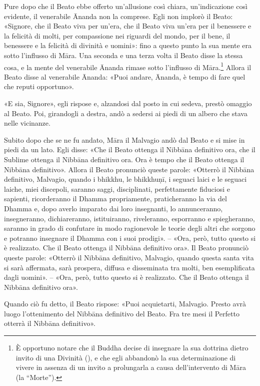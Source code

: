 Pure dopo che il Beato ebbe offerto un’allusione così chiara, un’indicazione
così evidente, il venerabile Ānanda non la comprese. Egli non implorò il Beato:
«Signore, che il Beato viva per un’era, che il Beato viva un’era per il
benessere e la felicità di molti, per compassione nei riguardi del mondo, per il
bene, il benessere e la felicità di divinità e uomini»: fino a questo punto la
sua mente era sotto l’influsso di Māra. Una seconda e una terza volta il Beato
disse la stessa cosa, e la mente del venerabile Ānanda rimase sotto l’influsso
di Māra.\footnote{È opportuno notare che il Buddha decise di insegnare la sua
  dottrina dietro invito di una Divinità
  (\hyperlink{cap-03-Dopo-l-Illuminazione#pag45}{}), e che egli abbandonò la sua
  determinazione di vivere in assenza di un invito a prolungarla a causa
  dell’intervento di Māra (la “Morte”).} Allora il Beato disse al venerabile
Ānanda: «Puoi andare, Ānanda, è tempo di fare quel che reputi opportuno».

«E sia, Signore», egli rispose e, alzandosi dal posto in cui sedeva, prestò
omaggio al Beato. Poi, girandogli a destra, andò a sedersi ai piedi di un albero
che stava nelle vicinanze.

Subito dopo che se ne fu andato, Māra il Malvagio andò dal Beato e si mise in
piedi da un lato. Egli disse: «Che il Beato ottenga il Nibbāna definitivo ora,
che il Sublime ottenga il Nibbāna definitivo ora. Ora è tempo che il Beato
ottenga il Nibbāna definitivo». Allora il Beato pronunciò queste parole:
«Otterrò il Nibbāna definitivo, Malvagio, quando i bhikkhu, le bhikkhuṇī, i
seguaci laici e le seguaci laiche, miei discepoli, saranno saggi, disciplinati,
perfettamente fiduciosi e sapienti, ricorderanno il Dhamma propriamente,
praticheranno la via del Dhamma e, dopo averlo imparato dai loro insegnanti, lo
annunceranno, insegneranno, dichiareranno, istituiranno, riveleranno, esporranno
e spiegheranno, saranno in grado di confutare in modo ragionevole le teorie
degli altri che sorgono e potranno insegnare il Dhamma con i suoi prodigi». –
«Ora, però, tutto questo si è realizzato. Che il Beato ottenga il Nibbāna
definitivo ora». Il Beato pronunciò queste parole: «Otterrò il Nibbāna
definitivo, Malvagio, quando questa santa vita si sarà affermata, sarà prospera,
diffusa e disseminata tra molti, ben esemplificata dagli uomini». – «Ora, però,
tutto questo si è realizzato. Che il Beato ottenga il Nibbāna definitivo ora».

Quando ciò fu detto, il Beato rispose: «Puoi acquietarti, Malvagio. Presto avrà
luogo l’ottenimento del Nibbāna definitivo del Beato. Fra tre mesi il Perfetto
otterrà il Nibbāna definitivo».

